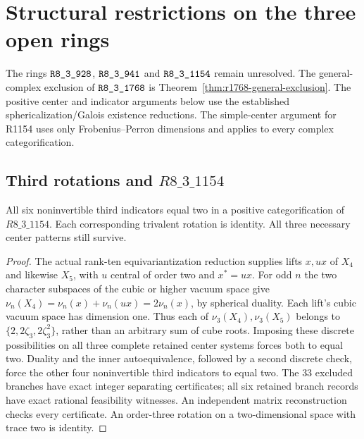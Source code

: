 \section{Structural restrictions on the three open rings}
\label{sec:pairing-frontier-20261027}
The rings $\sha{R8_3_928}$, $\sha{R8_3_941}$ and $\sha{R8_3_1154}$
remain unresolved. The general-complex exclusion of $\sha{R8_3_1768}$
is Theorem~\ref{thm:r1768-general-exclusion}. The positive center and
indicator arguments below use the established sphericalization/Galois
existence reductions. The simple-center argument for R1154 uses only
Frobenius--Perron dimensions and applies to every complex categorification.

\subsection{Third rotations and $R8\_3\_1154$}
\begin{proposition}
All six noninvertible third indicators equal two in a positive
categorification of $R8\_3\_1154$. Each corresponding trivalent rotation
is identity. All three necessary center patterns still survive.
\end{proposition}
\begin{proof}
The actual rank-ten equivariantization reduction supplies lifts $x,ux$
of $X_4$ and likewise $X_5$, with $u$ central of order two and $x^*=ux$.
For odd $n$ the two character subspaces of the cubic or higher vacuum
space give $\nu_n(X_4)=\nu_n(x)+\nu_n(ux)=2\nu_n(x)$, by spherical
duality. Each lift's cubic vacuum space has dimension one. Thus each of
$\nu_3(X_4),\nu_3(X_5)$ belongs to
$\{2,2\zeta_3,2\zeta_3^2\}$, rather than an arbitrary sum of cube roots.
Imposing these discrete possibilities on all three complete retained
center systems forces both to equal two. Duality and the inner
autoequivalence, followed by a second discrete check, force the other
four noninvertible third indicators to equal two. The $33$ excluded
branches have exact integer separating certificates; all six retained
branch records have exact rational feasibility witnesses. An independent
matrix reconstruction checks every certificate. An order-three rotation
on a two-dimensional space with trace two is identity.
\end{proof}

